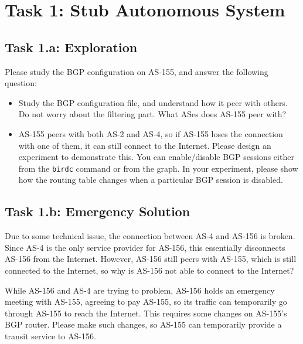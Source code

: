 \section{Task 1: Stub Autonomous System} 


\subsection{Task 1.a: Exploration} 

Please study the BGP configuration on AS-155, and answer the following question:

\begin{itemize}
  \item Study the BGP configuration file, and understand how it
    peer with others. Do not worry about the filtering part.
    What ASes does AS-155 peer with? 

  \item AS-155 peers with both AS-2 and AS-4, so if AS-155
    loses the connection with one of them, it can still connect
    to the Internet. Please design an experiment to 
    demonstrate this. You can enable/disable BGP sessions
    either from the \texttt{birdc} command or from the 
    graph. In your experiment, please show 
    how the routing table changes when a particular 
    BGP session is disabled. 
\end{itemize}



\subsection{Task 1.b: Emergency Solution} 

Due to some technical issue, the connection between AS-4 and AS-156 is broken. 
Since AS-4 is the only service provider for AS-156, this essentially
disconnects AS-156 from the Internet. However, AS-156 still peers with AS-155, 
which is still connected to the Internet, so why is AS-156 not able to 
connect to the Internet?  

While AS-156 and AS-4 are trying to problem, AS-156 holds an 
emergency meeting with AS-155, agreeing to pay AS-155, so its 
traffic can temporarily go through AS-155 to reach the Internet. 
This requires some changes on AS-155's BGP router. 
Please make such changes, so AS-155 can temporarily 
provide a transit service to AS-156.


